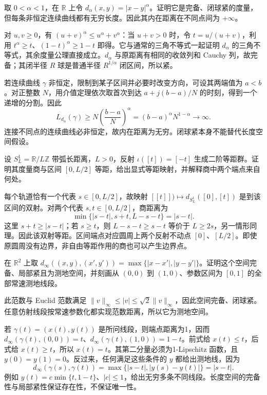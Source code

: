 \BookExercises
\begin{exercise}\label{g3:ex:snowflake-length}
	取 \(0<\alpha<1\)，在 \(\mathbb R\) 上令 \(d_\alpha(x,y)=|x-y|^\alpha\)。证明它是完备、闭球紧的度量，但每条非恒定连续曲线都有无穷长度。因此其内在距离在不同点间为 \(+\infty\)。
\end{exercise}
\begin{solution}
	对 \(u,v\ge0\)，有 \((u+v)^\alpha\le u^\alpha+v^\alpha\)：当 \(u+v>0\) 时，令 \(t=u/(u+v)\)，利用 \(t^\alpha\ge t\)、\((1-t)^\alpha\ge1-t\) 即得。它与通常的三角不等式一起证明 \(d_\alpha\) 的三角不等式，其余度量公理直接成立。\(d_\alpha\) 与原距离有相同的收敛列和 Cauchy 列，故完备；其闭半径 \(R\) 球是普通半径 \(R^{1/\alpha}\) 闭区间，所以紧。

	若连续曲线 \(\gamma\) 非恒定，限制到某子区间并必要时改变方向，可设其两端值为 \(a<b\)。对正整数 \(N\)，用介值定理依次取首次到达 \(a+j(b-a)/N\) 的时刻，得到一个递增的分割。因此
	\[
		L_{d_\alpha}(\gamma)\ge N\left(\frac{b-a}{N}\right)^\alpha
		=(b-a)^\alpha N^{1-\alpha}\longrightarrow\infty.
	\]
	连接不同点的连续曲线必非恒定，故内在距离为无穷。闭球紧本身不能替代长度空间假设。
\end{solution}

\begin{exercise}\label{g3:ex:circle-reflection-quotient}
	设 \(S^1_L=\mathbb R/L\mathbb Z\) 带弧长距离，\(L>0\)，反射 \(\iota([t])=[-t]\) 生成二阶等距群。证明其度量商与区间 \([0,L/2]\) 等距，给出显式等距映射，并解释商中两个端点来自何处。
\end{exercise}
\begin{solution}
	每个轨道恰有一个代表 \(s\in[0,L/2]\)，故映射 \([[t]])\mapsto d_{S^1_L}([0],[t])\) 是到该区间的双射。对两个代表 \(s,t\in[0,L/2]\)，商距离为
	\[
		\min\{|s-t|,s+t,L-s-t\}=|s-t|.
	\]
	这里 \(s+t\ge|s-t|\)；若 \(s\ge t\)，则 \(L-s-t\ge s-t\) 等价于 \(L\ge2s\)，另一情形同理。因此该双射等距。区间端点对应圆周上两个反射不动点 \([0]\)、\([L/2]\)。即使原圆周没有边界，非自由等距作用的商也可以产生边界点。
\end{solution}

\begin{exercise}\label{g3:ex:max-norm-geodesics}
	在 \(\mathbb R^2\) 上取 \(d_\infty((x,y),(x',y'))=\max\{|x-x'|,|y-y'|\}\)。证明这个空间完备、局部紧且为测地空间，并刻画从 \((0,0)\) 到 \((1,0)\)、参数区间为 \([0,1]\) 的全部常速测地线段。
\end{exercise}
\begin{solution}
	此范数与 Euclid 范数满足 \(\|v\|_\infty\le|v|\le\sqrt2\|v\|_\infty\)，因此空间完备、闭球紧。任意仿射线段按常速参数化都实现范数距离，所以它为测地空间。

	若 \(\gamma(t)=(x(t),y(t))\) 是所问线段，则端点距离为1，因而 \(d_\infty(\gamma(t),(0,0))=t\)、\(d_\infty(\gamma(t),(1,0))=1-t\)。前式给 \(x(t)\le t\)，后式给 \(x(t)\ge t\)，所以 \(x(t)=t\)。其第二分量必须为1-Lipschitz 函数，且 \(y(0)=y(1)=0\)。反过来，任何满足这些条件的 \(y\) 都给出测地线，因为
	\[
		d_\infty(\gamma(s),\gamma(t))=
		\max\{|s-t|,|y(s)-y(t)|\}=|s-t|.
	\]
	例如 \(y(t)=c\min\{t,1-t\}\)、\(|c|\le1\)，给出无穷多条不同线段。长度空间的完备性与局部紧性保证存在性，不保证唯一性。
\end{solution}

